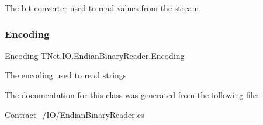 The bit converter used to read values from the stream 

\mbox{\label{class_t_net_1_1_i_o_1_1_endian_binary_reader_acd6eb5fbc4f1ce36f7ba50c1b3fc2d8d}} 
\subsubsection{\texorpdfstring{Encoding}{Encoding}}
{\footnotesize\ttfamily Encoding T\+Net.\+I\+O.\+Endian\+Binary\+Reader.\+Encoding\hspace{0.3cm}{\ttfamily [get]}}



The encoding used to read strings 



The documentation for this class was generated from the following file\+:\begin{DoxyCompactItemize}
\item 
Contract\+\_\+/\+I\+O/Endian\+Binary\+Reader.\+cs\end{DoxyCompactItemize}
